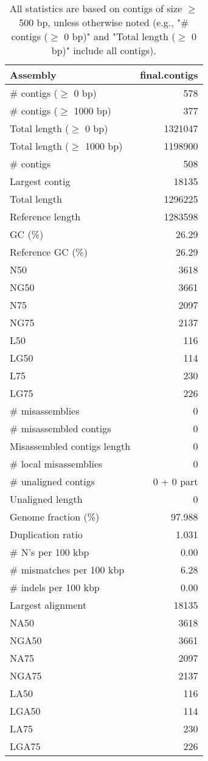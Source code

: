 \documentclass[12pt,a4paper]{article}
\begin{document}
\begin{table}[ht]
\begin{center}
\caption{All statistics are based on contigs of size $\geq$ 500 bp, unless otherwise noted (e.g., "\# contigs ($\geq$ 0 bp)" and "Total length ($\geq$ 0 bp)" include all contigs).}
\begin{tabular}{|l*{1}{|r}|}
\hline
Assembly & final.contigs \\ \hline
\# contigs ($\geq$ 0 bp) & 578 \\ \hline
\# contigs ($\geq$ 1000 bp) & 377 \\ \hline
Total length ($\geq$ 0 bp) & 1321047 \\ \hline
Total length ($\geq$ 1000 bp) & 1198900 \\ \hline
\# contigs & 508 \\ \hline
Largest contig & 18135 \\ \hline
Total length & 1296225 \\ \hline
Reference length & 1283598 \\ \hline
GC (\%) & 26.29 \\ \hline
Reference GC (\%) & 26.29 \\ \hline
N50 & 3618 \\ \hline
NG50 & 3661 \\ \hline
N75 & 2097 \\ \hline
NG75 & 2137 \\ \hline
L50 & 116 \\ \hline
LG50 & 114 \\ \hline
L75 & 230 \\ \hline
LG75 & 226 \\ \hline
\# misassemblies & 0 \\ \hline
\# misassembled contigs & 0 \\ \hline
Misassembled contigs length & 0 \\ \hline
\# local misassemblies & 0 \\ \hline
\# unaligned contigs & 0 + 0 part \\ \hline
Unaligned length & 0 \\ \hline
Genome fraction (\%) & 97.988 \\ \hline
Duplication ratio & 1.031 \\ \hline
\# N's per 100 kbp & 0.00 \\ \hline
\# mismatches per 100 kbp & 6.28 \\ \hline
\# indels per 100 kbp & 0.00 \\ \hline
Largest alignment & 18135 \\ \hline
NA50 & 3618 \\ \hline
NGA50 & 3661 \\ \hline
NA75 & 2097 \\ \hline
NGA75 & 2137 \\ \hline
LA50 & 116 \\ \hline
LGA50 & 114 \\ \hline
LA75 & 230 \\ \hline
LGA75 & 226 \\ \hline
\end{tabular}
\end{center}
\end{table}
\end{document}
